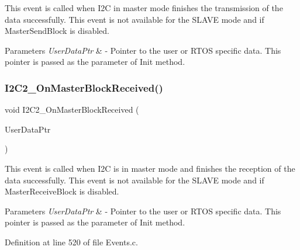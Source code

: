 This event is called when I2C in master mode finishes the transmission of the data successfully. This event is not available for the S\+L\+A\+VE mode and if Master\+Send\+Block is disabled. 


\begin{DoxyParams}{Parameters}
{\em User\+Data\+Ptr} & -\/ Pointer to the user or R\+T\+OS specific data. This pointer is passed as the parameter of Init method. \\
\hline
\end{DoxyParams}
\mbox{\label{group___events__module_ga5b2fe0871600de8d73184570a42e5b66}} 
\subsubsection{\texorpdfstring{I2\+C2\+\_\+\+On\+Master\+Block\+Received()}{I2C2\_OnMasterBlockReceived()}}
{\footnotesize\ttfamily void I2\+C2\+\_\+\+On\+Master\+Block\+Received (\begin{DoxyParamCaption}\item[{L\+D\+D\+\_\+\+T\+User\+Data $\ast$}]{User\+Data\+Ptr }\end{DoxyParamCaption})}



This event is called when I2C is in master mode and finishes the reception of the data successfully. This event is not available for the S\+L\+A\+VE mode and if Master\+Receive\+Block is disabled. 


\begin{DoxyParams}{Parameters}
{\em User\+Data\+Ptr} & -\/ Pointer to the user or R\+T\+OS specific data. This pointer is passed as the parameter of Init method. \\
\hline
\end{DoxyParams}


Definition at line 520 of file Events.\+c.

\mbox{\label{group___events__module_ga23f378d5253016b341bf971cb5c35ee7}} 
